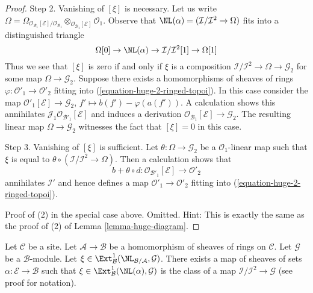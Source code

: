 \begin{proof}
\medskip\noindent
Step 2. Vanishing of $[\xi]$ is necessary. Let us write $\Omega =
\Omega_{\mathcal{O}_{\mathcal{B}_1}[\mathcal{E}]/\mathcal{O}_{\mathcal{B}_1}}
\otimes_{\mathcal{O}_{\mathcal{B}_1}[\mathcal{E}]} \mathcal{O}_1$.
Observe that $\NL(\alpha) = (\mathcal{I}/\mathcal{I}^2 \to \Omega)$
fits into a distinguished triangle
$$
\Omega[0] \to
\NL(\alpha) \to
\mathcal{I}/\mathcal{I}^2[1] \to
\Omega[1]
$$
Thus we see that $[\xi]$ is zero if and only if $\xi$
is a composition $\mathcal{I}/\mathcal{I}^2 \to \Omega \to \mathcal{G}_2$
for some map $\Omega \to \mathcal{G}_2$. Suppose there exists a
homomorphisms of sheaves of rings
$\varphi : \mathcal{O}'_1 \to \mathcal{O}'_2$ fitting into
(\ref{equation-huge-2-ringed-topoi}). In this case consider the map
$\mathcal{O}'_1[\mathcal{E}] \to \mathcal{G}_2$,
$f' \mapsto b(f') - \varphi(a(f'))$. A calculation
shows this annihilates $\mathcal{J}_1\mathcal{O}_{\mathcal{B}'_1}[\mathcal{E}]$
and induces a derivation
$\mathcal{O}_{\mathcal{B}_1}[\mathcal{E}] \to \mathcal{G}_2$.
The resulting linear map $\Omega \to \mathcal{G}_2$ witnesses the
fact that $[\xi] = 0$ in this case.

\medskip\noindent
Step 3. Vanishing of $[\xi]$ is sufficient. Let
$\theta : \Omega \to \mathcal{G}_2$ be a $\mathcal{O}_1$-linear map
such that $\xi$ is equal to
$\theta \circ (\mathcal{I}/\mathcal{I}^2 \to \Omega)$.
Then a calculation shows that
$$
b + \theta \circ d :
\mathcal{O}_{\mathcal{B}'_1}[\mathcal{E}]
\longrightarrow
\mathcal{O}'_2
$$
annihilates $\mathcal{I}'$ and hence defines a map
$\mathcal{O}'_1 \to \mathcal{O}'_2$ fitting into
(\ref{equation-huge-2-ringed-topoi}).

\medskip\noindent
Proof of (2) in the special case above. Omitted. Hint:
This is exactly the same as the proof of (2) of
Lemma \ref{lemma-huge-diagram}.
\end{proof}

\begin{lemma}
\label{lemma-NL-represent-ext-class-ringed-topoi}
Let $\mathcal{C}$ be a site. Let $\mathcal{A} \to \mathcal{B}$ be a
homomorphism of sheaves of rings on $\mathcal{C}$.
Let $\mathcal{G}$ be a $\mathcal{B}$-module.
Let
$\xi \in \Ext^1_\mathcal{B}(\NL_{\mathcal{B}/\mathcal{A}}, \mathcal{G})$. 
There exists a map of sheaves of sets $\alpha : \mathcal{E} \to \mathcal{B}$
such that $\xi \in \Ext^1_\mathcal{B}(\NL(\alpha), \mathcal{G})$
is the class of a map $\mathcal{I}/\mathcal{I}^2 \to \mathcal{G}$
(see proof for notation).
\end{lemma}

